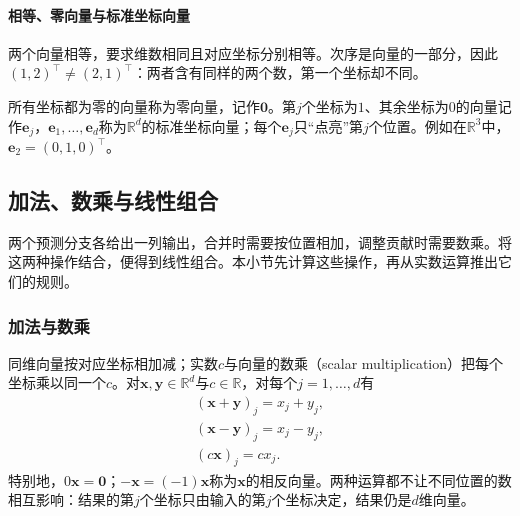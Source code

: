 \paragraph{相等、零向量与标准坐标向量}
两个向量相等，要求维数相同且对应坐标分别相等。次序是向量的一部分，因此$(1,2)^\top\neq(2,1)^\top$：两者含有同样的两个数，第一个坐标却不同。

所有坐标都为零的向量称为零向量，记作$\bm0$。第$j$个坐标为$1$、其余坐标为$0$的向量记作$\bm e_j$，$\bm e_1,\ldots,\bm e_d$称为$\mathbb R^d$的标准坐标向量；每个$\bm e_j$只“点亮”第$j$个位置。例如在$\mathbb R^3$中，$\bm e_2=(0,1,0)^\top$。

\subsection{加法、数乘与线性组合}
\label{sec:ls-vector-operations}

两个预测分支各给出一列输出，合并时需要按位置相加，调整贡献时需要数乘。将这两种操作结合，便得到线性组合。本小节先计算这些操作，再从实数运算推出它们的规则。

\subsubsection{加法与数乘}
\label{sec:ls-addition-scaling}

同维向量按对应坐标相加减；实数$c$与向量的数乘（scalar multiplication）把每个坐标乘以同一个$c$。对$\bm x,\bm y\in\mathbb R^d$与$c\in\mathbb R$，对每个$j=1,\ldots,d$有
\[
 \begin{gathered}
 (\bm x+\bm y)_j=x_j+y_j,\\
 (\bm x-\bm y)_j=x_j-y_j,\\
 (c\bm x)_j=cx_j.
 \end{gathered}
\]
特别地，$0\bm x=\bm0$；$-\bm x=(-1)\bm x$称为$\bm x$的相反向量。两种运算都不让不同位置的数相互影响：结果的第$j$个坐标只由输入的第$j$个坐标决定，结果仍是$d$维向量。

